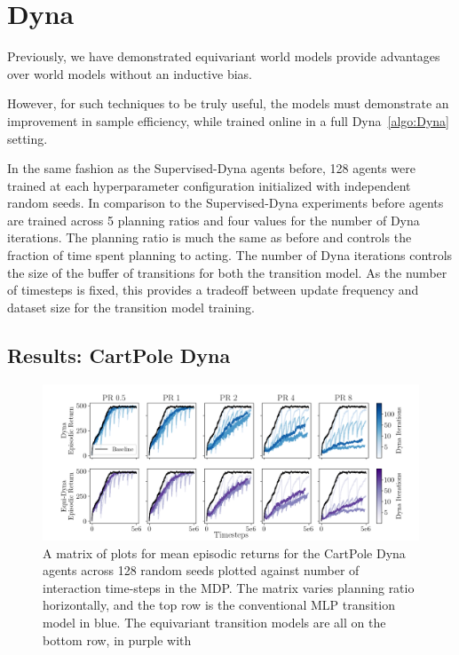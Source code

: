 \section{Dyna}\label{sec:Dyna_experiment}
Previously, we have demonstrated equivariant world models provide advantages over world models without an inductive bias.

However, for such techniques to be truly useful, the models must demonstrate an improvement in sample efficiency, while trained online in a full Dyna~\ref{algo:Dyna} setting.

In the same fashion as the Supervised-Dyna agents before, 128 agents were trained at each hyperparameter configuration initialized with independent random seeds. In comparison to the Supervised-Dyna experiments before agents are trained across 5 planning ratios and four values for the number of Dyna iterations. The planning ratio is much the same as before and controls the fraction of time spent planning to acting. The number of Dyna iterations controls the size of the buffer of transitions for both the transition model. As the number of timesteps is fixed, this provides a tradeoff between update frequency and dataset size for the transition model training.

\subsection{Results: CartPole Dyna}
\begin{figure}
	\centering
	\includegraphics[width=\textwidth]{Figures/dyna_sweep_cp.png}
	\caption{A matrix of plots for mean episodic returns for the CartPole Dyna agents across 128 random seeds
		plotted against number of interaction time-steps in the MDP. The matrix varies planning ratio horizontally, and the top row is the conventional MLP transition model in blue. The equivariant transition models are all on the bottom row, in purple with }
	\label{fig:cp_dyna}
\end{figure}



